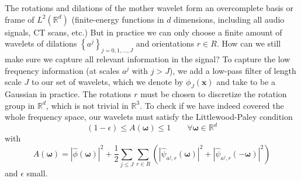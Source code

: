 \documentclass[twocolumn, openany, twoside, article]{memoir}
\begin{document}
The rotations and dilations of the mother wavelet form an overcomplete basis or frame of $L^2(\mathbb{R}^d)$
(finite-energy functions in $d$ dimensions, including all audio signals, CT scans, etc.) But in practice we can only
choose a finite amount of wavelets of dilations $\left\{ a^j \right\}_{j = 0, 1, \dots, J}$ and orientations $r \in R$.
How can we still make sure we capture all relevant information in the signal?
To capture the low frequency information (at scales $a^j$ with $j > J$), we add a low-pass filter of
length scale $J$ to our set of wavelets, which we denote by $\phi_J(\bm{x})$ and take to be a Gaussian in practice.
The rotations $r$ must be chosen to discretize the rotation group in $\mathbb{R}^d$, which is not trivial in $\mathbb{R}^3$.
To check if we have indeed covered the whole frequency space, our wavelets must satisfy the Littlewood-Paley condition
\begin{equation}
  (1 - \epsilon) \leq A(\bm{\omega}) \leq 1 \qquad \forall \bm{\omega} \in \mathbb{R}^d
\end{equation}
with
\begin{equation}
  A(\bm{\omega}) = \left| \hat{\phi}(\bm{\omega}) \right|^2 + \frac{1}{2} \sum_{j \leq J} \sum_{r \in R}
  \left( \left| \hat{\psi}_{a^j, r}(\bm{\omega}) \right|^2 + \left| \hat{\psi}_{a^j, r}(\bm{-\omega}) \right|^2 \right)
\end{equation}
and $\epsilon$ small.




\printbibliography
\end{document}
